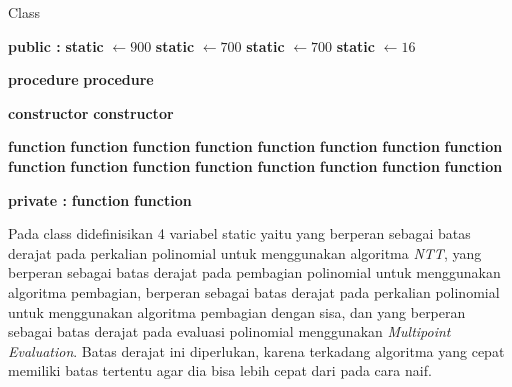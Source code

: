 \begin{algorithm}
	\caption{Class }
	\label{psdo:class_poly}
	\begin{algorithmic}[1]
		\State \textbf{public : }
		\State \textbf{static}  $ \leftarrow 900 $
		\State \textbf{static}  $ \leftarrow 700 $
		\State \textbf{static}  $ \leftarrow 700 $
		\State \textbf{static}  $ \leftarrow 16 $

		\State \textbf{procedure} 
		\State \textbf{procedure} 

		\State \textbf{constructor} 
		\State \textbf{constructor} 
		
		\State \textbf{function} 
		\State \textbf{function} 
		\State \textbf{function} 
		\State \textbf{function} 
		\State \textbf{function} 
		\State \textbf{function} 
		\State \textbf{function} 
		\State \textbf{function} 
		\State \textbf{function} 
		\State \textbf{function} 
		\State \textbf{function} 
		\State \textbf{function} 
		\State \textbf{function} 
		\State \textbf{function} 
		\State \textbf{function} 
		\State \textbf{function} 
		
		\State \textbf{private : }
		\State \textbf{function} 
		\State \textbf{function} 

	\end{algorithmic}
\end{algorithm}

Pada class  didefinisikan 4 variabel static yaitu  yang berperan sebagai batas derajat pada perkalian polinomial untuk menggunakan algoritma \textit{NTT},  yang berperan sebagai batas derajat pada pembagian polinomial untuk menggunakan algoritma pembagian,  berperan sebagai batas derajat pada perkalian polinomial untuk menggunakan algoritma pembagian dengan sisa, dan  yang berperan sebagai batas derajat pada evaluasi polinomial menggunakan \textit{Multipoint Evaluation}. Batas derajat ini diperlukan, karena terkadang algoritma yang cepat memiliki batas tertentu agar dia bisa lebih cepat dari pada cara naif.

